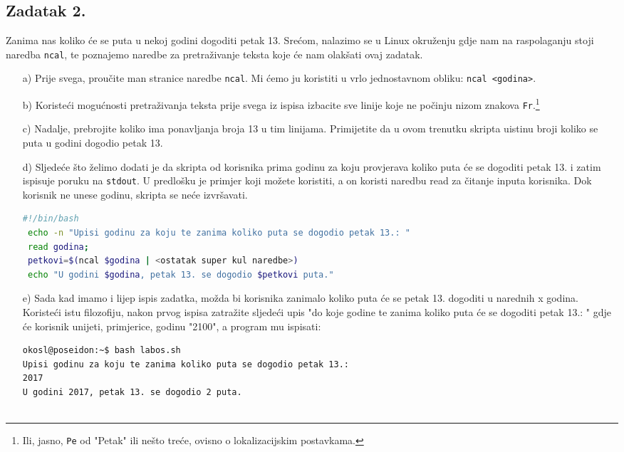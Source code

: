 \documentclass{exam}
\newcommand{\shell}[1]{\texttt{#1}}
\begin{document}
\subsection*{Zadatak 2.}
Zanima nas koliko će se puta u nekoj godini dogoditi
petak 13. Srećom, nalazimo se u Linux okruženju gdje nam na raspolaganju stoji
naredba \shell{ncal}, te poznajemo naredbe za pretraživanje teksta koje će nam
olakšati ovaj zadatak.
\begin{itemize}
  
\item[a)] Prije svega, proučite man stranice naredbe \shell{ncal}. Mi ćemo ju
  koristiti u vrlo jednostavnom obliku: \shell{ncal <godina>}.
\item[b)] Koristeći mogućnosti pretraživanja teksta prije svega iz ispisa
  izbacite sve linije koje ne počinju nizom znakova \shell{Fr}.\footnote{Ili,
    jasno, \shell{Pe} od "Petak" ili nešto treće, ovisno o lokalizacijskim
    postavkama.}
\item[c)] Nadalje, prebrojite koliko ima ponavljanja broja 13 u tim linijama. Primijetite da u ovom trenutku
skripta uistinu broji koliko se puta u godini dogodio petak 13.

\item[d)]
  Sljedeće što želimo dodati je da skripta od korisnika prima godinu za koju
  provjerava koliko puta će se dogoditi petak 13. i zatim ispisuje poruku na
  \shell{stdout}. U predlošku je primjer koji možete koristiti, a on koristi
  naredbu read za čitanje inputa korisnika. Dok korisnik ne unese godinu, skripta
  se neće izvršavati.
\begin{lstlisting}[language=bash,caption={Čitanje inputa}]
 #!/bin/bash
 echo -n "Upisi godinu za koju te zanima koliko puta se dogodio petak 13.: "
 read godina;
 petkovi=$(ncal $godina | <ostatak super kul naredbe>)
 echo "U godini $godina, petak 13. se dogodio $petkovi puta."
\end{lstlisting}

\item[e)]
  Sada kad imamo i lijep ispis zadatka, možda bi korisnika zanimalo koliko puta
  će se petak 13. dogoditi u narednih x godina. Koristeći istu filozofiju, nakon
  prvog ispisa zatražite sljedeći upis "do koje godine te zanima koliko puta će se
  dogoditi petak 13.: " gdje će korisnik unijeti, primjerice, godinu "2100", a
  program mu ispisati:
  
\begin{lstlisting}[caption={Ispis}]
okosl@poseidon:~$ bash labos.sh
Upisi godinu za koju te zanima koliko puta se dogodio petak 13.: 
2017
U godini 2017, petak 13. se dogodio 2 puta.  
                                                                                                

\end{lstlisting}
\end{itemize}
\end{document}
